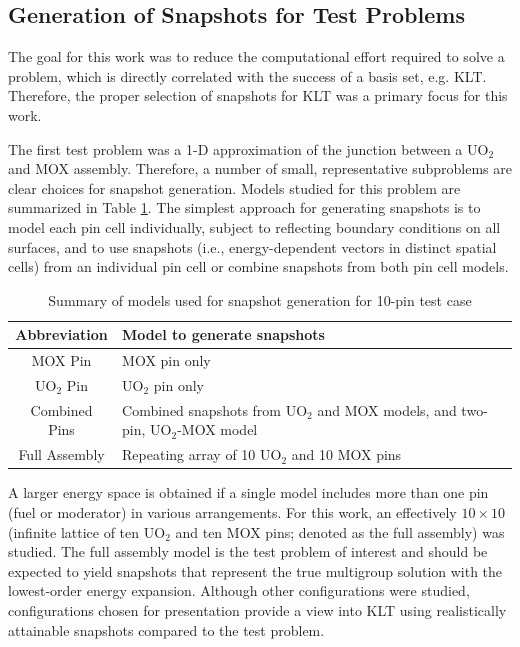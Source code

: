 \documentclass[5p,times,twocolumn,10pt]{elsarticle}
\begin{document}
    \subsection{Generation of Snapshots for Test Problems}

    The goal for this work was to reduce the computational effort
    required to solve a problem, which is directly correlated with the success
    of a basis set, e.g. KLT.  Therefore, the proper selection of snapshots for
    KLT was a primary focus for this work.

    The first test problem was a 1-D approximation of the junction between a
    UO$_2$ and MOX assembly. Therefore, a number of small, representative
    subproblems are clear choices for snapshot generation. Models studied for
    this problem are summarized in Table \ref{tab:snapshots}. The simplest
    approach for generating snapshots is to model each pin cell individually,
    subject to reflecting boundary conditions on all surfaces, and to use
    snapshots (i.e., energy-dependent vectors in distinct spatial cells) from
    an individual pin cell or combine snapshots from both pin cell models.

    \begin{table}[htb]
        \centering
        \caption{Summary of models used for snapshot generation for 10-pin test
            case}
        \begin{tabular}{c | l}\toprule
            Abbreviation    & Model to generate snapshots \\ \midrule
            MOX Pin         & MOX pin only \\
            UO$_2$ Pin      & UO$_2$ pin only \\
            Combined Pins   & Combined snapshots from UO$_2$ and MOX models,
and
            two-pin, UO$_2$-MOX model \\
            Full Assembly   & Repeating array of 10 UO$_2$ and 10 MOX pins \\
            \bottomrule
        \end{tabular}
        \label{tab:snapshots}
    \end{table}

    A larger energy space is obtained if a single model includes more than one
    pin (fuel or moderator) in various arrangements.  For this work, an
    effectively $10\times 10$ (infinite lattice of ten UO$_2$ and ten MOX pins;
    denoted as the full assembly) was studied.  The full assembly model is the
    test problem of interest and should be expected to yield snapshots that
    represent the true multigroup solution with the lowest-order energy
    expansion.  Although other configurations were studied, configurations
    chosen for presentation provide a view into KLT using realistically
    attainable snapshots compared to the test problem.
\end{document}

